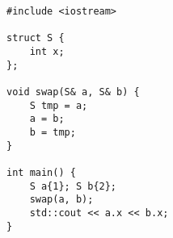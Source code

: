 \begin{lstlisting}[title=\href{https://godbolt.org/z/r6oq55}{\texttt{godbolt.org/z/r6oq55}}]
#include <iostream>

struct S { 
    int x;
};

void swap(S& a, S& b) {
    S tmp = a;
    a = b;
    b = tmp;
}

int main() {
    S a{1}; S b{2};
    swap(a, b);
    std::cout << a.x << b.x;
}
\end{lstlisting}
